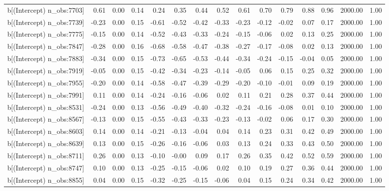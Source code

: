 \begin{table}[ht]
\begin{tabular}{rrrrrrrrrrrrrrr}
  b[(Intercept) n\_obs:7703] & 0.61 & 0.00 & 0.14 & 0.24 & 0.35 & 0.44 & 0.52 & 0.61 & 0.70 & 0.79 & 0.88 & 0.96 & 2000.00 & 1.00 \\ 
  b[(Intercept) n\_obs:7739] & -0.23 & 0.00 & 0.15 & -0.61 & -0.52 & -0.42 & -0.33 & -0.23 & -0.12 & -0.02 & 0.07 & 0.17 & 2000.00 & 1.00 \\ 
  b[(Intercept) n\_obs:7775] & -0.15 & 0.00 & 0.14 & -0.52 & -0.43 & -0.33 & -0.24 & -0.15 & -0.06 & 0.02 & 0.13 & 0.25 & 2000.00 & 1.00 \\ 
  b[(Intercept) n\_obs:7847] & -0.28 & 0.00 & 0.16 & -0.68 & -0.58 & -0.47 & -0.38 & -0.27 & -0.17 & -0.08 & 0.02 & 0.13 & 2000.00 & 1.00 \\ 
  b[(Intercept) n\_obs:7883] & -0.34 & 0.00 & 0.15 & -0.73 & -0.65 & -0.53 & -0.44 & -0.34 & -0.24 & -0.15 & -0.04 & 0.05 & 2000.00 & 1.00 \\ 
  b[(Intercept) n\_obs:7919] & -0.05 & 0.00 & 0.15 & -0.42 & -0.34 & -0.23 & -0.14 & -0.05 & 0.06 & 0.15 & 0.25 & 0.32 & 2000.00 & 1.00 \\ 
  b[(Intercept) n\_obs:7955] & -0.20 & 0.00 & 0.14 & -0.58 & -0.47 & -0.39 & -0.29 & -0.20 & -0.10 & -0.01 & 0.09 & 0.19 & 2000.00 & 1.00 \\ 
  b[(Intercept) n\_obs:7991] & 0.11 & 0.00 & 0.14 & -0.24 & -0.16 & -0.06 & 0.02 & 0.11 & 0.21 & 0.28 & 0.37 & 0.44 & 2000.00 & 1.00 \\ 
  b[(Intercept) n\_obs:8531] & -0.24 & 0.00 & 0.13 & -0.56 & -0.49 & -0.40 & -0.32 & -0.24 & -0.16 & -0.08 & 0.01 & 0.10 & 2000.00 & 1.00 \\ 
  b[(Intercept) n\_obs:8567] & -0.13 & 0.00 & 0.15 & -0.55 & -0.43 & -0.33 & -0.23 & -0.13 & -0.02 & 0.06 & 0.17 & 0.30 & 2000.00 & 1.00 \\ 
  b[(Intercept) n\_obs:8603] & 0.14 & 0.00 & 0.14 & -0.21 & -0.13 & -0.04 & 0.04 & 0.14 & 0.23 & 0.31 & 0.42 & 0.49 & 2000.00 & 1.00 \\ 
  b[(Intercept) n\_obs:8639] & 0.13 & 0.00 & 0.15 & -0.26 & -0.16 & -0.06 & 0.03 & 0.13 & 0.24 & 0.33 & 0.43 & 0.50 & 2000.00 & 1.00 \\ 
  b[(Intercept) n\_obs:8711] & 0.26 & 0.00 & 0.13 & -0.10 & -0.00 & 0.09 & 0.17 & 0.26 & 0.35 & 0.42 & 0.52 & 0.59 & 2000.00 & 1.00 \\ 
  b[(Intercept) n\_obs:8747] & 0.10 & 0.00 & 0.13 & -0.25 & -0.15 & -0.06 & 0.02 & 0.10 & 0.19 & 0.27 & 0.36 & 0.44 & 2000.00 & 1.00 \\ 
  b[(Intercept) n\_obs:8855] & 0.04 & 0.00 & 0.15 & -0.32 & -0.25 & -0.15 & -0.06 & 0.04 & 0.15 & 0.24 & 0.34 & 0.42 & 2000.00 & 1.00 \\ 

\end{tabular}
\end{table}
